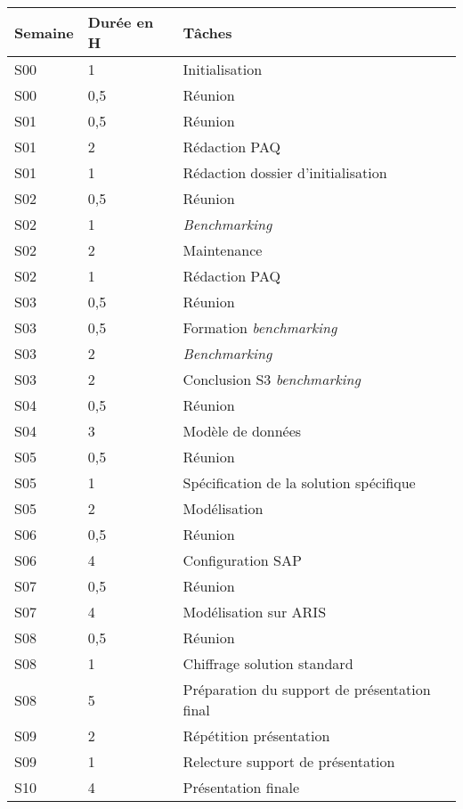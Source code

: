 \begin{longtable}{|l|l|l|}
\endhead \hline
Semaine&Durée en H&Tâches\\
\hline
S00&1&Initialisation\\
\hline
S00&0,5&Réunion\\
\hline
S01&0,5&Réunion\\
\hline
S01&2&Rédaction PAQ\\
\hline
S01&1&Rédaction dossier d'initialisation\\
\hline
S02&0,5&Réunion\\
\hline
S02&1&\textsl{Benchmarking}\\
\hline
S02&2&Maintenance\\
\hline
S02&1&Rédaction PAQ\\
\hline
S03&0,5&Réunion\\
\hline
S03&0,5&Formation \textsl{benchmarking}\\
\hline
S03&2&\textsl{Benchmarking}\\
\hline
S03&2&Conclusion S3 \textsl{benchmarking}\\
\hline
S04&0,5&Réunion\\
\hline
S04&3&Modèle de données\\
\hline
S05&0,5&Réunion\\
\hline
S05&1&Spécification de la solution spécifique\\
\hline
S05&2&Modélisation\\
\hline
S06&0,5&Réunion\\
\hline
S06&4&Configuration SAP\\
\hline
S07&0,5&Réunion\\
\hline
S07&4&Modélisation sur ARIS\\
\hline
S08&0,5&Réunion\\
\hline
S08&1&Chiffrage solution standard\\
\hline
S08&5&Préparation du support de présentation final\\
\hline
S09&2&Répétition présentation\\
\hline
S09&1&Relecture support de présentation\\
\hline
S10&4&Présentation finale\\
\hline
\end{longtable}

\pagebreak

